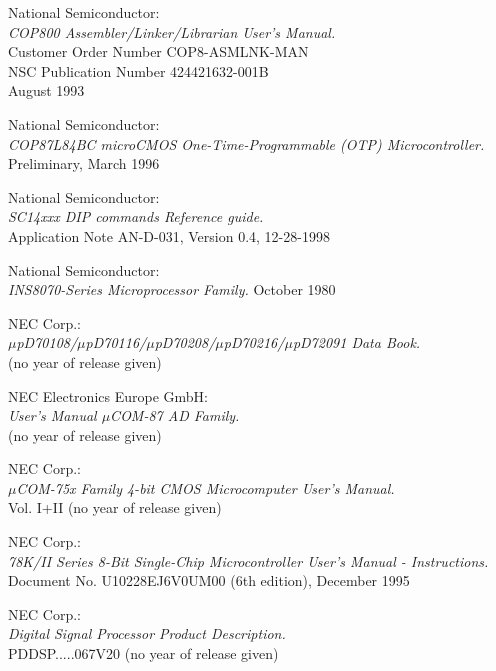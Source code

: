 \documentclass[12pt,twoside]{report}
\begin{document}
\begin{thebibliography}{99}
 National Semiconductor: \\
                 {\em COP800 Assembler/Linker/Librarian User's
                 Manual.\/} \\
                 Customer Order Number COP8-ASMLNK-MAN \\
                 NSC Publication Number 424421632-001B \\
                 August 1993

 National Semiconductor: \\
                   {\em COP87L84BC microCMOS One-Time-Programmable (OTP)
                    Microcontroller.\/} \\
                   Preliminary, March 1996

 National Semiconductor: \\
                   {\em SC14xxx DIP commands Reference guide.} \\
                   Application Note AN-D-031, Version 0.4, 12-28-1998

 National Semiconductor: \\ 
                  {\em INS8070-Series Microprocessor Family.\/} 
                  October 1980 

 NEC Corp.: \\
   	       {\em $\mu$pD70108/$\mu$pD70116/$\mu$pD70208/$\mu$pD70216/$\mu$pD72091 
               Data Book.\/} \\
               (no year of release given)

 NEC Electronics Europe GmbH: \\
                  {\em User's Manual $\mu$COM-87 AD Family.\/} \\
		  (no year of release given)

 NEC Corp.: \\
                {\em $\mu$COM-75x Family 4-bit CMOS Microcomputer User's
                 Manual.\/} \\
                Vol. I+II (no year of release given)

 NEC Corp.: \\
                {\em 78K/II Series 8-Bit Single-Chip Microcontroller
                 User's Manual - Instructions.\/} \\
                Document No. U10228EJ6V0UM00 (6th edition), December 1995

 NEC Corp.: \\
                {\em Digital Signal Processor Product Description.\/} \\
                PDDSP.....067V20 (no year of release given)


\end{thebibliography}
\end{document}
